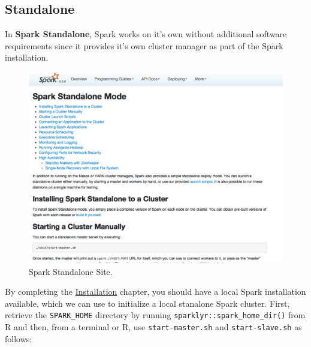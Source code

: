 \documentclass[]{book}
\theoremstyle{definition}
\theoremstyle{definition}
\theoremstyle{definition}
\theoremstyle{remark}
\begin{document}
\hypertarget{clusters-standalone}{%
\subsection{Standalone}\label{clusters-standalone}}

In \textbf{Spark Standalone}, Spark works on it's own without additional
software requirements since it provides it's own cluster manager as part
of the Spark installation.

\begin{figure}

{\centering \includegraphics[width=13.78in]{images/05-clusters-spark-standalone} 

}

\caption{Spark Standalone Site.}\label{fig:spark-standalone}
\end{figure}

By completing the \protect\hyperlink{installation}{Installation}
chapter, you should have a local Spark installation available, which we
can use to initialize a local stanalone Spark cluster. First, retrieve
the \texttt{SPARK\_HOME} directory by running
\texttt{sparklyr::spark\_home\_dir()} from R and then, from a terminal
or R, use \texttt{start-master.sh} and \texttt{start-slave.sh} as
follows:
\end{document}
